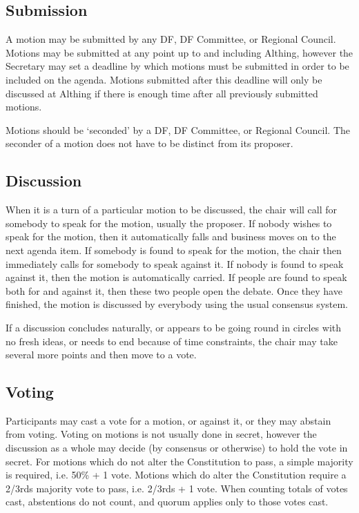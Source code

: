 \documentclass[a4paper, 12pt]{article} %
\begin{document}
\subsection{Submission}
A motion may be submitted by any DF, DF Committee, or Regional Council.  Motions may be submitted at any point up to and including Althing, however the Secretary may set a deadline by which motions must be submitted in order to be included on the agenda.  Motions submitted after this deadline will only be discussed at Althing if there is enough time after all previously submitted motions.

Motions should be `seconded' by a DF, DF Committee, or Regional Council.  The seconder of a motion does not have to be distinct from its proposer.

\subsection{Discussion}
When it is a turn of a particular motion to be discussed, the chair will call for somebody to speak for the motion, usually the proposer.  If nobody wishes to speak for the motion, then it automatically falls and business moves on to the next agenda item.  If somebody is found to speak for the motion, the chair then immediately calls for somebody to speak against it.  If nobody is found to speak against it, then the motion is automatically carried.  If people are found to speak both for and against it, then these two people open the debate.  Once they have finished, the motion is discussed by everybody using the usual consensus system.

If a discussion concludes naturally, or appears to be going round in circles with no fresh ideas, or needs to end because of time constraints, the chair may take several more points and then move to a vote.

\subsection{Voting}
\label{sec:motionvoting}
Participants may cast a vote for a motion, or against it, or they may abstain from voting.  Voting on motions is not usually done in secret, however the discussion as a whole may decide (by consensus or otherwise) to hold the vote in secret.  For motions which do not alter the Constitution to pass, a simple majority is required, i.e. 50\% + 1 vote.  Motions which do alter the Constitution require a 2/3rds majority vote to pass, i.e. 2/3rds + 1 vote.  When counting totals of votes cast, abstentions do not count, and quorum applies only to those votes cast.
\end{document}
